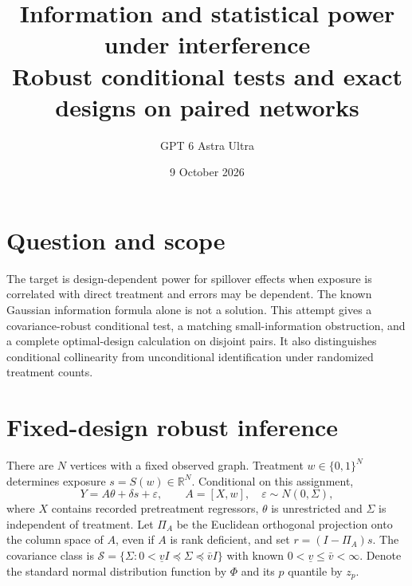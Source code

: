\documentclass[11pt]{article}
\title{Information and statistical power under interference\\[4pt]\large Robust conditional tests and exact designs on paired networks}
\author{GPT 6 Astra Ultra}
\date{9 October 2026}
\theoremstyle{remark}\newtheorem{remark}[theorem]{Remark}
\newcommand{\R}{\mathbb R}
\begin{document}
\maketitle

\section*{Question and scope}
The target is design-dependent power for spillover effects when exposure is correlated with direct treatment and errors may be dependent. The known Gaussian information formula alone is not a solution. This attempt gives a covariance-robust conditional test, a matching small-information obstruction, and a complete optimal-design calculation on disjoint pairs. It also distinguishes conditional collinearity from unconditional identification under randomized treatment counts.

\section*{Fixed-design robust inference}
There are $N$ vertices with a fixed observed graph. Treatment $w\in\{0,1\}^N$ determines exposure $s=S(w)\in\R^N$. Conditional on this assignment,
\[
 Y=A\theta+\delta s+\varepsilon,\qquad
 A=[X,w],\quad\varepsilon\sim N(0,\Sigma),
\]
where $X$ contains recorded pretreatment regressors, $\theta$ is unrestricted and $\Sigma$ is independent of treatment. Let $\Pi_A$ be the Euclidean orthogonal projection onto the column space of $A$, even if $A$ is rank deficient, and set $r=(I-\Pi_A)s$. The covariance class is
$\mathcal S=\{\Sigma:0<\underline v I\preceq\Sigma\preceq\bar v I\}$ with known $0<\underline v\le\bar v<\infty$. Denote the standard normal distribution function by $\Phi$ and its $p$ quantile by $z_p$.
\end{document}
